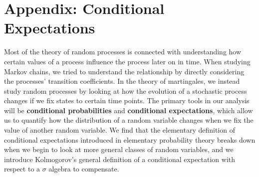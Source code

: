 \chapter{Appendix: Conditional Expectations}

Most of the theory of random processes is connected with understanding how certain values of a process influence the process later on in time. When studying Markov chains, we tried to understand the relationship by directly considering the processes' transition coefficients. In the theory of martingales, we instead study random processes by looking at how the evolution of a stochastic process changes if we fix states to certain time points. The primary tools in our analysis will be {\bf conditional probabilities} and {\bf conditional expectations}, which allow us to quantify how the distribution of a random variable changes when we fix the value of another random variable. We find that the elementary definition of conditional expectations introduced in elementary probability theory breaks down when we begin to look at more general classes of random variables, and we introduce Kolmogorov's general definition of a conditional expectation with respect to a $\sigma$ algebra to compensate.

